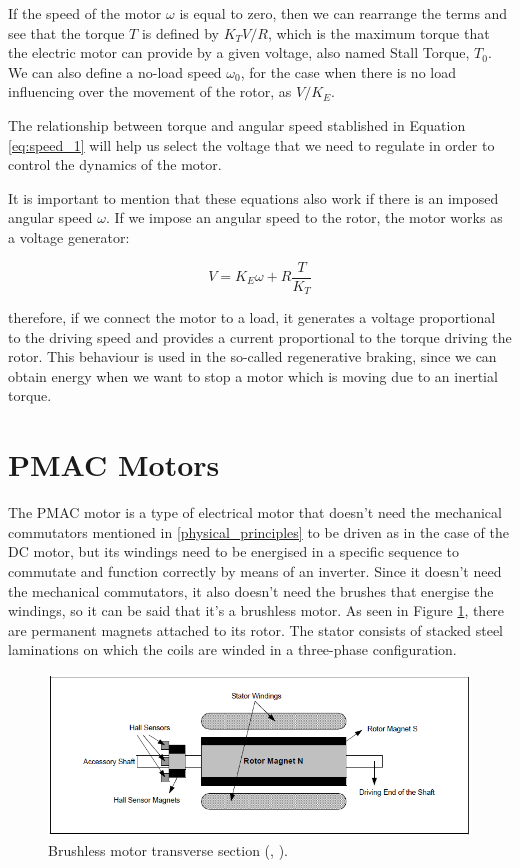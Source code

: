 If the speed of the motor $\omega$ is equal to zero, then we can rearrange the terms and see that the torque $T$ is defined by $K_{T}V/R$, which is the maximum torque that the electric motor can provide by a given voltage, also named Stall Torque, $T_{0}$. We can also define a no-load speed $\omega_{0}$, for the case when there is no load influencing over the movement of the rotor, as $V/K_{E}$.

The relationship between torque and angular speed stablished in Equation \ref{eq:speed_1} will help us select the voltage that we need to regulate in order to control the dynamics of the motor.

It is important to mention that these equations also work if there is an imposed angular speed $\omega$. If we impose an angular speed to the rotor, the motor works as a voltage generator:

\begin{equation} \label{eq:generator_1}
	V = K_{E} \omega + R\frac{T}{K_{T}}
\end{equation}

therefore, if we connect the motor to a load, it generates a voltage proportional to the driving speed and provides a current proportional to the torque driving the rotor. This behaviour is used in the so-called regenerative braking, since we can obtain energy when we want to stop a motor which is moving due to an inertial torque.

\section{PMAC Motors}

The \acf{PMAC} motor is a type of electrical motor that doesn't need the mechanical commutators mentioned in \ref{physical_principles} to be driven as in the case of the DC motor, but its windings need to be energised in a specific sequence to commutate and function correctly by means of an inverter. Since it doesn't need the mechanical commutators, it also doesn't need the brushes that energise the windings, so it can be said that it's a brushless motor. As seen in Figure \ref{fig:brushless_section}, there are permanent magnets attached to its rotor. The stator consists of stacked steel laminations on which the coils are winded in a three-phase configuration.

\begin{figure}[htbp]
	\centering
	\includegraphics[width=12cm]{Images/brushless_section.png} 
	\caption[Brushless Motor Transverse Section]{Brushless motor transverse section (\citeauthor{microchip}, \citeyear{microchip}).}
	\label{fig:brushless_section}
\end{figure}

